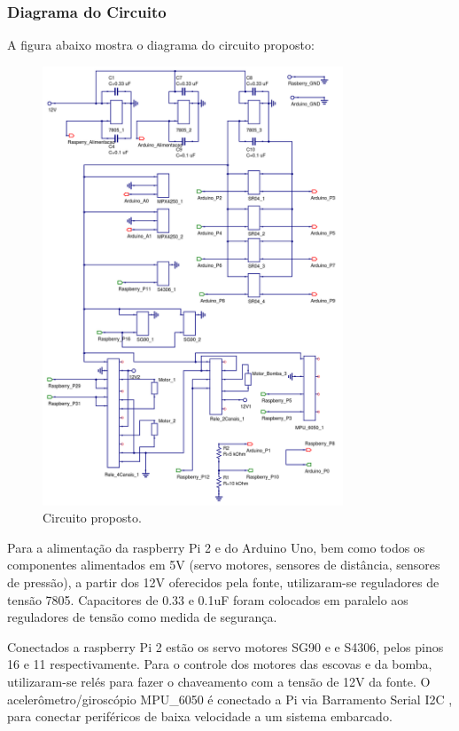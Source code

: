 \subsubsection{Diagrama do Circuito}
A figura abaixo mostra o diagrama do circuito proposto:
\par
\begin{figure}[h]
  \centering
  \includegraphics[width=0.8\textwidth]{figures/circuit.png}
  \caption{Circuito proposto.}
  \label{fig:circuit}
\end{figure}
\FloatBarrier
\par

Para a alimentação da raspberry Pi 2 e do Arduino Uno, bem como todos os componentes alimentados em 5V (servo motores, sensores de distância, sensores de pressão), a partir dos 12V oferecidos pela fonte, utilizaram-se reguladores de tensão 7805. Capacitores de 0.33 e 0.1uF foram colocados em paralelo aos reguladores de tensão como medida de segurança.

Conectados a raspberry Pi 2 estão os servo motores SG90 e e S4306, pelos pinos 16 e 11 respectivamente. Para o controle dos motores das escovas e da bomba, utilizaram-se relés para fazer o chaveamento com a tensão de 12V da fonte. O acelerômetro/giroscópio MPU\_6050 é conectado a Pi via Barramento Serial I2C , para conectar periféricos de baixa velocidade a um sistema embarcado.

